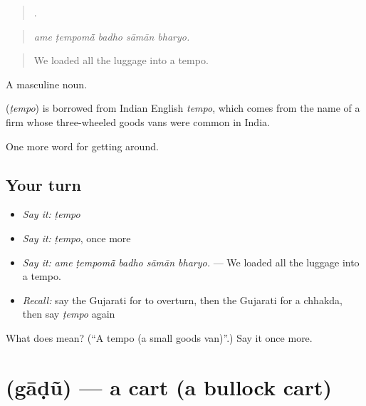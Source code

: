 \begin{quote}
    .
\end{quote}

\begin{quote}
\emph{ame ṭempomā̃ badho sāmān bharyo.}
\end{quote}

\begin{quote}
We loaded all the luggage into a tempo.
\end{quote}

A masculine noun.

\begin{cousinweb}
\textbf{} (\emph{ṭempo}) is borrowed from Indian English \emph{tempo}, which comes from the name of a firm whose three-wheeled goods vans were common in India.
\end{cousinweb}

\begin{grammarlens}[title={What you've built}]
One more word for getting around.
\end{grammarlens}

\subsection*{Your turn}
\begin{itemize}
\raggedright
  \item \emph{Say it:} \emph{ṭempo}
  \item \emph{Say it:} \emph{ṭempo}, once more
  \item \emph{Say it:} \emph{ame ṭempomā̃ badho sāmān bharyo.} — We loaded all the luggage into a tempo.
  \item \emph{Recall:} say the Gujarati for to overturn, then the Gujarati for a chhakda, then say \emph{ṭempo} again
\end{itemize}

\begin{tcolorbox}[breakable,colback=teal!4,colframe=teal!35!black,title={Before you move on}]
What does  mean? (\textquotedblleft{}A tempo (a small goods van)\textquotedblright{}.) Say it once more.
\end{tcolorbox}
\section[\texorpdfstring{\gu{ગાડું} (gāḍũ)}{ગાડું (gāḍũ)}]{ (gāḍũ) — a cart (a bullock cart)}

